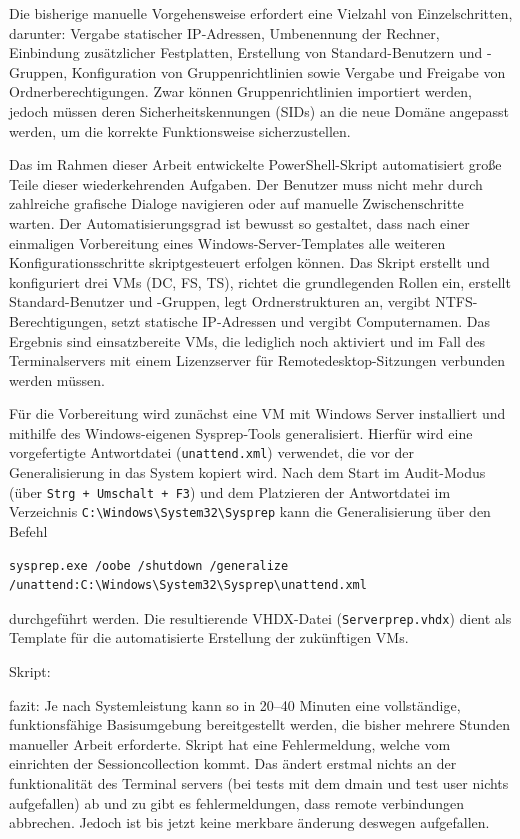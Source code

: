 \documentclass[conference]{IEEEtran}
\begin{document}
Die bisherige manuelle Vorgehensweise erfordert eine Vielzahl von Einzelschritten, darunter: Vergabe statischer IP-Adressen, Umbenennung der Rechner, Einbindung zusätzlicher Festplatten, Erstellung von Standard-Benutzern und -Gruppen, Konfiguration von Gruppenrichtlinien sowie Vergabe und Freigabe von Ordnerberechtigungen. Zwar können Gruppenrichtlinien importiert werden, jedoch müssen deren Sicherheitskennungen (SIDs) an die neue Domäne angepasst werden, um die korrekte Funktionsweise sicherzustellen.

Das im Rahmen dieser Arbeit entwickelte PowerShell-Skript automatisiert große Teile dieser wiederkehrenden Aufgaben. Der Benutzer muss nicht mehr durch zahlreiche grafische Dialoge navigieren oder auf manuelle Zwischenschritte warten. Der Automatisierungsgrad ist bewusst so gestaltet, dass nach einer einmaligen Vorbereitung eines Windows-Server-Templates alle weiteren Konfigurationsschritte skriptgesteuert erfolgen können. Das Skript erstellt und konfiguriert drei VMs (DC, FS, TS), richtet die grundlegenden Rollen ein, erstellt Standard-Benutzer und -Gruppen, legt Ordnerstrukturen an, vergibt NTFS-Berechtigungen, setzt statische IP-Adressen und vergibt Computernamen. Das Ergebnis sind einsatzbereite VMs, die lediglich noch aktiviert und im Fall des Terminalservers mit einem Lizenzserver für Remotedesktop-Sitzungen verbunden werden müssen.

Für die Vorbereitung wird zunächst eine VM mit Windows Server installiert und mithilfe des Windows-eigenen Sysprep-Tools generalisiert. Hierfür wird eine vorgefertigte Antwortdatei (\texttt{unattend.xml}) verwendet, die vor der Generalisierung in das System kopiert wird. Nach dem Start im Audit-Modus (über \texttt{Strg + Umschalt + F3}) und dem Platzieren der Antwortdatei im Verzeichnis \texttt{C:\textbackslash Windows\textbackslash System32\textbackslash Sysprep} kann die Generalisierung über den Befehl
\begin{verbatim}
sysprep.exe /oobe /shutdown /generalize /unattend:C:\Windows\System32\Sysprep\unattend.xml
\end{verbatim}
durchgeführt werden. Die resultierende VHDX-Datei (\texttt{Serverprep.vhdx}) dient als Template für die automatisierte Erstellung der zukünftigen VMs.


Skript:


fazit:
Je nach Systemleistung kann so in 20--40 Minuten eine vollständige, funktionsfähige Basisumgebung bereitgestellt werden, die bisher mehrere Stunden manueller Arbeit erforderte.
Skript hat eine Fehlermeldung, welche vom einrichten der Sessioncollection kommt. Das ändert erstmal nichts an der funktionalität des Terminal servers (bei tests mit dem dmain und test user nichts aufgefallen)
ab und zu gibt es fehlermeldungen, dass remote verbindungen abbrechen. Jedoch ist bis jetzt keine merkbare änderung deswegen aufgefallen.
\end{document}
